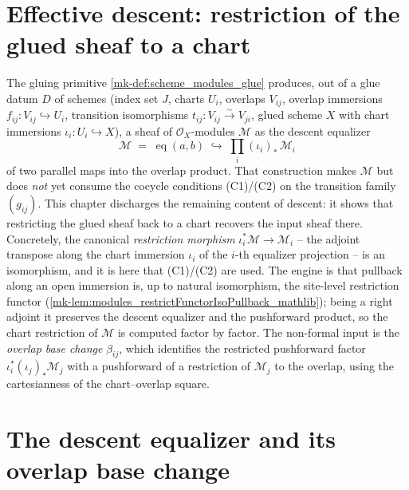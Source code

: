 \section{Effective descent: restriction of the glued sheaf to a chart}
\label{mk-chap:Picard_GlueDescent}

\providecommand{\ShMod}{\mathrm{SheafOfModules}}

The gluing primitive \ref{mk-def:scheme_modules_glue} produces, out of a glue datum
\(D\) of schemes (index set \(J\), charts \(U_i\), overlaps \(V_{ij}\), overlap
immersions \(f_{ij} : V_{ij} \hookrightarrow U_i\), transition isomorphisms
\(t_{ij} : V_{ij} \xrightarrow{\sim} V_{ji}\), glued scheme \(X\) with chart
immersions \(\iota_i : U_i \hookrightarrow X\)), a sheaf of \(\mathcal{O}_X\)-modules
\(\mathcal{M}\) as the descent equalizer
\[
  \mathcal{M} \;=\; \operatorname{eq}(a, b)
    \;\hookrightarrow\; \prod_{i} (\iota_i)_{*}\,\mathcal{M}_i
\]
of two parallel maps into the overlap product. That construction makes
\(\mathcal{M}\) but does \emph{not} yet consume the cocycle conditions (C1)/(C2) on
the transition family \((g_{ij})\). This chapter discharges the remaining content of
descent: it shows that restricting the glued sheaf back to a chart recovers the
input sheaf there. Concretely, the canonical \emph{restriction morphism}
\(\iota_i^{*}\mathcal{M} \to \mathcal{M}_i\) -- the adjoint transpose along the chart
immersion \(\iota_i\) of the \(i\)-th equalizer projection -- is an isomorphism, and
it is here that (C1)/(C2) are used. The engine is that pullback along an open
immersion is, up to natural isomorphism, the site-level restriction functor
(\ref{mk-lem:modules_restrictFunctorIsoPullback_mathlib}); being a right adjoint it
preserves the descent equalizer and the pushforward product, so the chart
restriction of \(\mathcal{M}\) is computed factor by factor. The non-formal input is
the \emph{overlap base change} \(\beta_{ij}\), which identifies the restricted
pushforward factor \(\iota_i^{*}(\iota_j)_{*}\mathcal{M}_j\) with a pushforward of a
restriction of \(\mathcal{M}_j\) to the overlap, using the cartesianness of the
chart--overlap square.

\section{The descent equalizer and its overlap base change}
\label{mk-sec:gd_equalizer}

